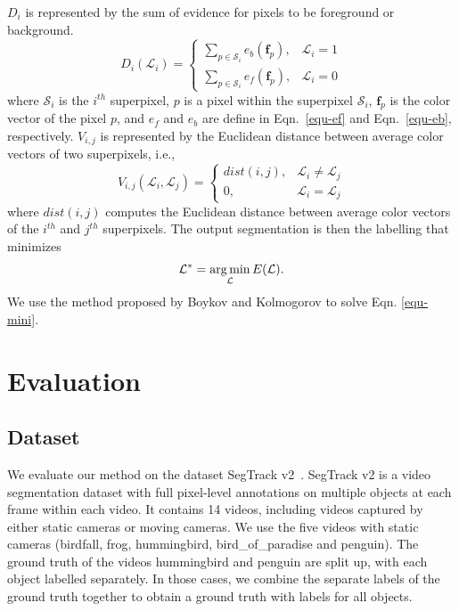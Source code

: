 $D_{i}$ is represented by the sum of evidence for pixels to be foreground or background.
\begin{equation}
	D_{i}(\mathcal{L}_{i})=
	\begin{cases}
		\sum_{p\in\mathcal{S}_{i}}e_{b}(\mathbf{f}_{p}), & \mathcal{L}_{i}=1\\
		\sum_{p\in\mathcal{S}_{i}}e_{f}(\mathbf{f}_{p}), & \mathcal{L}_{i}=0
	\end{cases}
\end{equation}
where $\mathcal{S}_{i}$ is the $i^{th}$ superpixel, $p$ is a pixel within the superpixel $\mathcal{S}_{i}$, $\mathbf{f}_{p}$ is the color vector of the pixel $p$, and $e_{f}$ and $e_{b}$ are define in Eqn.~\ref{equ-ef} and Eqn.~\ref{equ-eb}, respectively. $V_{i,j}$ is represented by the Euclidean distance between average color vectors of two superpixels, i.e.,
\begin{equation}
	V_{i,j}(\mathcal{L}_{i},\mathcal{L}_{j})=
	\begin{cases}
		dist(i,j), & \mathcal{L}_{i}\neq\mathcal{L}_{j}\\
		0, & \mathcal{L}_{i}=\mathcal{L}_{j}
	\end{cases}
\end{equation}
where $dist(i,j)$ computes the Euclidean distance between average color vectors of the $i^{th}$ and $j^{th}$ superpixels. The output segmentation is then the labelling that minimizes
\begin{equation}
	\label{equ-mini}
	\mathcal{L}^{*}=\operatorname*{arg\,min}_{\mathcal{L}}E(\mathcal{L}).
\end{equation}
We use the method proposed by Boykov and Kolmogorov \cite{boykov2004} to solve Eqn. \ref{equ-mini}.

\section{Evaluation}
\label{os-evaluation}

\subsection{Dataset}
\label{os-dataset}

We evaluate our method on the dataset SegTrack v2~\cite{f-li2013}. SegTrack v2 is a video segmentation dataset with full pixel-level annotations on multiple objects at each frame within each video.
It contains 14 videos, including videos captured by either static cameras or moving cameras. We use the five videos with static cameras (birdfall, frog, hummingbird, bird\_of\_paradise and penguin).
The ground truth of the videos hummingbird and penguin are split up, with each object labelled separately. In those cases, we combine the separate labels of the ground truth together to obtain a ground truth with labels for all objects.

